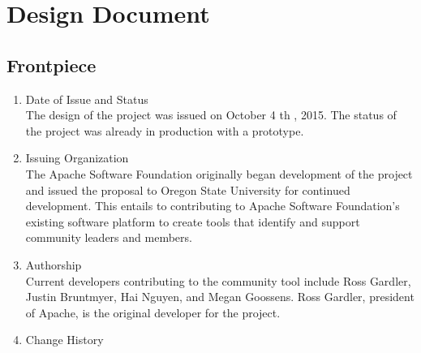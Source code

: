 \documentclass[draftclsnofoot,10pt,onecolumn]{IEEEtran} %
\begin{document}
\newpage
\section{Design Document}

\subsection{Frontpiece}
	\begin{enumerate}
	
		\item Date of Issue and Status \\
		The design of the project was issued on October 4 th , 2015. The status of the project was already in production with a
		prototype.\\
		
		\item Issuing Organization \\
		The Apache Software Foundation originally began development of the project and issued the proposal to Oregon
		State University for continued development. This entails to contributing to Apache Software Foundation’s existing
		software platform to create tools that identify and support community leaders and members.\\
		
		\item Authorship \\
		Current developers contributing to the community tool include Ross Gardler, Justin Bruntmyer, Hai Nguyen, and
		Megan Goossens. Ross Gardler, president of Apache, is the original developer for the project.\\
		
		\item Change History \\
		
	\end{enumerate}
	
\end{document}
